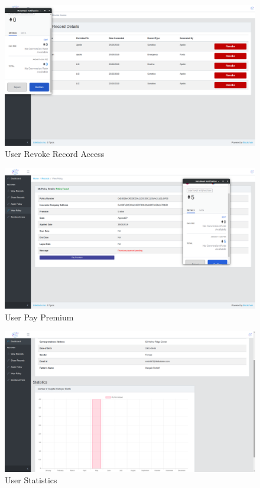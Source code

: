 \begin{figure}[!b]
	\centering
	\includegraphics[width=\linewidth]{Images/User/UserRevokeRecordAccess.png}
	\caption{ User Revoke Record Access}
\end{figure}
\begin{figure}[!b]
	\centering
	\includegraphics[width=\linewidth]{Images/User/UserPayPremium.png}
	\caption{ User Pay Premium}
\end{figure}

\begin{figure}[!b]
	\centering
	\includegraphics[width=\linewidth]{Images/User/UserStatistics.png}
	\caption{ User Statistics}
\end{figure}

